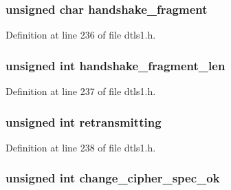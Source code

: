 \subsubsection[{\texorpdfstring{handshake\+\_\+fragment}{handshake_fragment}}]{\setlength{\rightskip}{0pt plus 5cm}unsigned char handshake\+\_\+fragment}\hypertarget{structdtls1__state__st_a434f29ae735bb2efecc7132d718fa1c1}{}\label{structdtls1__state__st_a434f29ae735bb2efecc7132d718fa1c1}


Definition at line 236 of file dtls1.\+h.

\subsubsection[{\texorpdfstring{handshake\+\_\+fragment\+\_\+len}{handshake_fragment_len}}]{\setlength{\rightskip}{0pt plus 5cm}unsigned int handshake\+\_\+fragment\+\_\+len}\hypertarget{structdtls1__state__st_a810b0f6ab3d1979beb8c3a45cfc21987}{}\label{structdtls1__state__st_a810b0f6ab3d1979beb8c3a45cfc21987}


Definition at line 237 of file dtls1.\+h.

\subsubsection[{\texorpdfstring{retransmitting}{retransmitting}}]{\setlength{\rightskip}{0pt plus 5cm}unsigned int retransmitting}\hypertarget{structdtls1__state__st_a3bbb053e9a3d604e84db3933a7999b4e}{}\label{structdtls1__state__st_a3bbb053e9a3d604e84db3933a7999b4e}


Definition at line 238 of file dtls1.\+h.

\subsubsection[{\texorpdfstring{change\+\_\+cipher\+\_\+spec\+\_\+ok}{change_cipher_spec_ok}}]{\setlength{\rightskip}{0pt plus 5cm}unsigned int change\+\_\+cipher\+\_\+spec\+\_\+ok}\hypertarget{structdtls1__state__st_a5b07271dda2c4c89220266017cecddc1}{}\label{structdtls1__state__st_a5b07271dda2c4c89220266017cecddc1}


